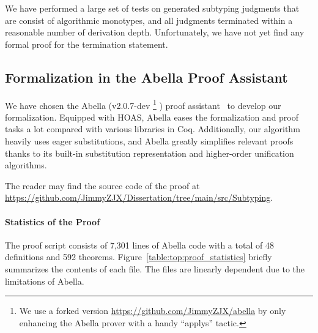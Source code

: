 We have performed a large set of tests on generated subtyping judgments
that are consist of algorithmic monotypes,
and all judgments terminated within a reasonable number of derivation depth.
Unfortunately, we have not yet find any formal proof for the termination statement.

\subsection{Formalization in the Abella Proof Assistant}

We have chosen the Abella (v2.0.7-dev
\footnote{We use a forked version \url{https://github.com/JimmyZJX/abella} by only enhancing the Abella prover with a handy
``applys'' tactic.}
) proof assistant~\citep{AbellaDesc} to develop our formalization.
Equipped with HOAS, Abella eases the formalization and proof tasks a lot
compared with various libraries in Coq.
Additionally, our algorithm heavily uses eager substitutions,
and Abella greatly simplifies relevant proofs thanks to its built-in
substitution representation and higher-order unification algorithms.

The reader may find the source code of the proof at \url{https://github.com/JimmyZJX/Dissertation/tree/main/src/Subtyping}.

\paragraph{Statistics of the Proof}
The proof script consists of 7,301 lines of Abella code with a total of
48 definitions and 592 theorems.
Figure~\ref{table:top:proof_statistics} briefly summarizes the contents of each file.
The files are linearly dependent due to the limitations of Abella.

